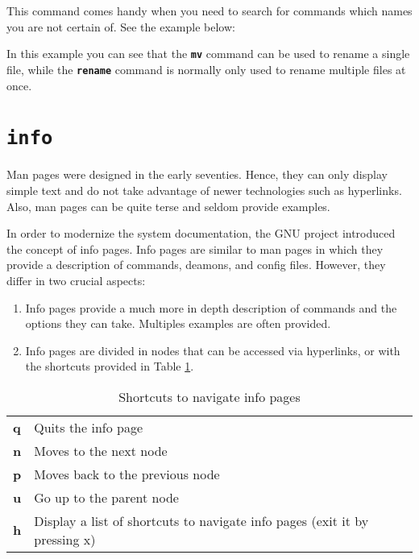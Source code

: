 This command comes handy when you need to search for commands which names you are not certain of. See the example below:

In this example you can see that the \textbf{\texttt{mv}} command can be used to rename a single file, while the \textbf{\texttt{rename}} command is normally only used to rename multiple files at once.

\section{\textbf{\texttt{info}}}

Man pages were designed in the early seventies. Hence, they can only display simple text and do not take advantage of newer technologies such as hyperlinks. Also, man pages can be quite terse and seldom provide examples.

In order to modernize the system documentation, the GNU project introduced the concept of info pages. Info pages are similar to man pages in which they provide a description of commands, deamons, and config files. However, they differ in two crucial aspects:

\begin{enumerate}
 \item Info pages provide a much more in depth description of commands and the options they can take. Multiples examples are often provided.
 \item Info pages are divided in nodes that can be accessed via hyperlinks, or with the shortcuts provided in Table \ref{tab:info_pages}.
\end{enumerate}

\begin{table}[!htbp]
   \myfloatalign
   \begin{tabularx}{\textwidth}{Xp{95mm}} \toprule
     \textbf{q} & Quits the info page \\
     \textbf{n} & Moves to the next node\\
     \textbf{p} & Moves back to the previous node\\
     \textbf{u} & Go up to the parent node\\
     \textbf{h} & Display a list of shortcuts to navigate info pages (exit it by pressing x)\\
     \bottomrule
   \end{tabularx}
\caption{Shortcuts to navigate info pages}
\label{tab:info_pages}
\end{table}

